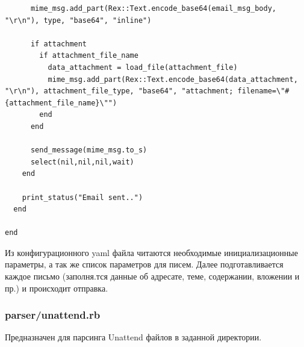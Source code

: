 \documentclass[10pt,a4paper]{article}
\begin{document}
\begin{verbatim}
      mime_msg.add_part(Rex::Text.encode_base64(email_msg_body, "\r\n"), type, "base64", "inline")

      if attachment
        if attachment_file_name
          data_attachment = load_file(attachment_file)
          mime_msg.add_part(Rex::Text.encode_base64(data_attachment, "\r\n"), attachment_file_type, "base64", "attachment; filename=\"#{attachment_file_name}\"")
        end
      end

      send_message(mime_msg.to_s)
      select(nil,nil,nil,wait)
    end

    print_status("Email sent..")
  end

end
\end{verbatim}

Из конфигурационного yaml файла читаются необходимые инициализационные параметры, а так же список параметров для писем.
Далее подготавливается каждое письмо (заполня.тся данные об адресате, теме, содержании, вложении и пр.) и происходит отправка.


\subsubsection{parser/unattend.rb}

Предназначен для парсинга Unattend файлов в заданной директории.
\end{document}
